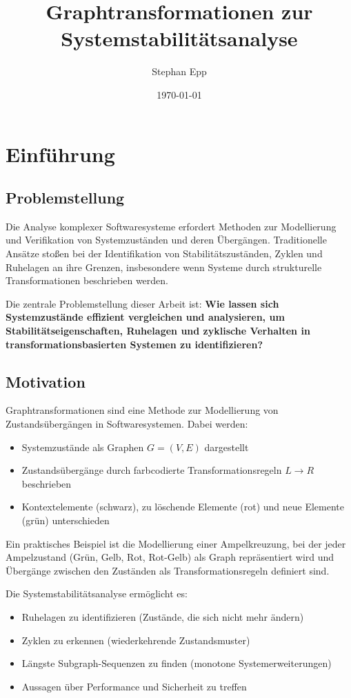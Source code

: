 \documentclass[a4paper,12pt]{article}
\title{Graphtransformationen zur Systemstabilitätsanalyse}
\author{Stephan Epp}
\date{\today}
\theoremstyle{definition}
\begin{document}
	
\maketitle

\tableofcontents
\newpage

\section{Einführung}

\subsection{Problemstellung}

Die Analyse komplexer Softwaresysteme erfordert Methoden zur Modellierung und Verifikation von Systemzuständen und deren Übergängen. Traditionelle Ansätze stoßen bei der Identifikation von Stabilitätszuständen, Zyklen und Ruhelagen an ihre Grenzen, insbesondere wenn Systeme durch strukturelle Transformationen beschrieben werden.

Die zentrale Problemstellung dieser Arbeit ist: \textbf{Wie lassen sich Systemzustände effizient vergleichen und analysieren, um Stabilitätseigenschaften, Ruhelagen und zyklische Verhalten in transformationsbasierten Systemen zu identifizieren?}

\subsection{Motivation}

Graphtransformationen sind eine Methode zur Modellierung von Zustandsübergängen in Softwaresystemen. Dabei werden:

\begin{itemize}
	\item[-] Systemzustände als Graphen $G = (V, E)$ dargestellt
	\item[-] Zustandsübergänge durch farbcodierte Transformationsregeln $L \rightarrow R$ beschrieben
	\item[-] Kontextelemente (schwarz), zu löschende Elemente (rot) und neue Elemente (grün) unterschieden
\end{itemize}

Ein praktisches Beispiel ist die Modellierung einer Ampelkreuzung, bei der jeder Ampelzustand (Grün, Gelb, Rot, Rot-Gelb) als Graph repräsentiert wird und Übergänge zwischen den Zuständen als Transformationsregeln definiert sind.

Die Systemstabilitätsanalyse ermöglicht es:
\begin{itemize}
	\item[-] Ruhelagen zu identifizieren (Zustände, die sich nicht mehr ändern)
	\item[-] Zyklen zu erkennen (wiederkehrende Zustandsmuster)
	\item[-] Längste Subgraph-Sequenzen zu finden (monotone Systemerweiterungen)
	\item[-] Aussagen über Performance und Sicherheit zu treffen
\end{itemize}
\end{document}
